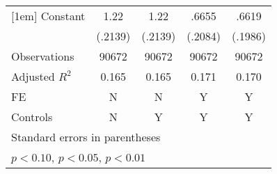 \begin{table}[htbp]
\begin{tabular}{l*{4}{c}}
[1em]
Constant            &        1.22\sym{***}&        1.22\sym{***}&       .6655\sym{***}&       .6619\sym{***}\\
                    &     (.2139)         &     (.2139)         &     (.2084)         &     (.1986)         \\
\hline
Observations        &       90672         &       90672         &       90672         &       90672         \\
Adjusted \(R^{2}\)  &       0.165         &       0.165         &       0.171         &       0.170         \\
FE                  &           N         &           N         &           Y         &           Y         \\
Controls            &           N         &           Y         &           Y         &           Y         \\
\hline\hline
\multicolumn{5}{l}{\footnotesize Standard errors in parentheses}\\
\multicolumn{5}{l}{\footnotesize \sym{*} \(p<0.10\), \sym{**} \(p<0.05\), \sym{***} \(p<0.01\)}\\
\end{tabular}
\end{table}
